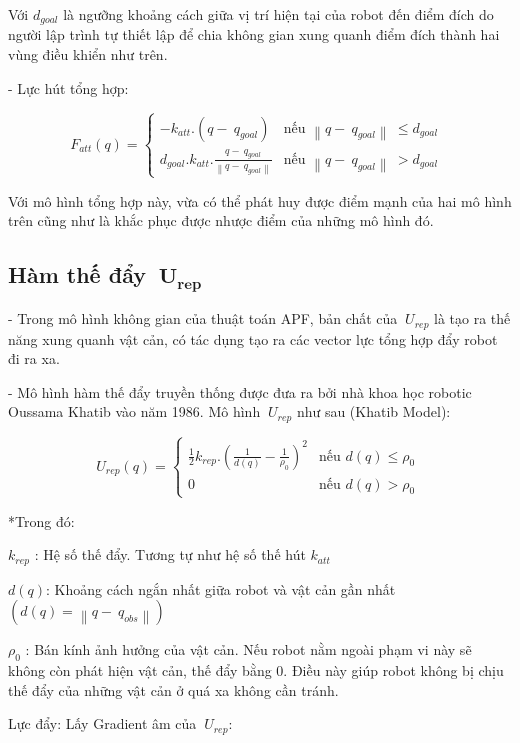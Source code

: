 \documentclass[12pt,a4paper,oneside]{report}
\begin{document}
Với \(d_{goal}\) là ngưỡng khoảng cách giữa vị trí hiện tại của robot đến điểm đích do người lập trình tự thiết lập để chia không gian xung quanh điểm đích thành hai vùng điều khiển như trên.

- Lực hút tổng hợp:

\[F_{att}(q) = \begin{cases}
 - k_{att}.(q - {\ q}_{goal}) & \text{nếu } \left\| q - {\ q}_{goal} \right\|\  \leq d_{goal}\  \\
d_{goal}.k_{att}.\frac{q - {\ q}_{goal}}{\left\| q - {\ q}_{goal} \right\|} & \text{nếu } \left\| q - {\ q}_{goal} \right\|\  > d_{goal}\ 
\end{cases}\ \]

Với mô hình tổng hợp này, vừa có thể phát huy được điểm mạnh của hai mô hình trên cũng như là khắc phục được nhược điểm của những mô hình đó.

\subsection{Hàm thế đẩy \(\mathbf{\ U}_{\mathbf{rep}}\)}

- Trong mô hình không gian của thuật toán APF, bản chất của \({\ U}_{rep}\) là tạo ra thế năng xung quanh vật cản, có tác dụng tạo ra các vector lực tổng hợp đẩy robot đi ra xa.

- Mô hình hàm thế đẩy truyền thống được đưa ra bởi nhà khoa học robotic Oussama Khatib vào năm 1986. Mô hình \({\ U}_{rep}\) như sau (Khatib Model):

\[U_{rep}(q) = \begin{cases}
\frac{1}{2}k_{rep}.\left( \frac{1}{d(q)} - \frac{1}{\rho_{0}} \right)^{2} & \text{nếu } d(q) \leq \rho_{0} \\
0 & \text{nếu } d(q) > \rho_{0}
\end{cases}\ \]

*Trong đó:

\(k_{rep}\) : Hệ số thế đẩy. Tương tự như hệ số thế hút \(k_{att}\)

\(d(q)\): Khoảng cách ngắn nhất giữa robot và vật cản gần nhất \(\left( d(q) = \left\| q - {\ q}_{obs} \right\| \right)\)

\(\rho_{0}\) : Bán kính ảnh hưởng của vật cản. Nếu robot nằm ngoài phạm vi này sẽ không còn phát hiện vật cản, thế đẩy bằng 0. Điều này giúp robot không bị chịu thế đẩy của những vật cản ở quá xa không cần tránh.

Lực đẩy: Lấy Gradient âm của \({\ U}_{rep}\):
\end{document}
